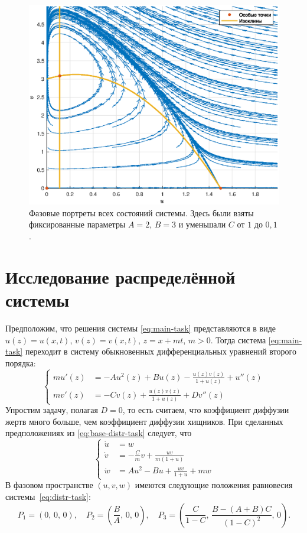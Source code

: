 \documentclass[a4paper, 11pt]{article}
\begin{document}
\begin{figure}[t]
		\includegraphics[width=0.45\linewidth]{schema/all_6.eps}
		\caption{Фазовые портреты всех состояний системы. Здесь были взяты фиксированные параметры $A = 2$, $B = 3$ и уменьшали $C$ от $1$ до $0,\!1$.}
	\end{figure}
	\clearpage


	\section{Исследование распределённой системы}
	Предположим, что решения системы \eqref{eq:main-task} представляются в виде $u(z) = u(x, t)$, $v(z) = v(x, t)$, $z = x + mt$, $m > 0$. Тогда система \eqref{eq:main-task} переходит в систему обыкновенных дифференциальных уравнений второго порядка:
	\begin{equation}\label{eq:base-distr-task}
		\left\{\begin{aligned}
		m u'(z) &= -Au^2(z) + Bu(z) - \frac{u(z)v(z)}{1 + u(z)} + u''(z)\\
		m v'(z) &= -Cv(z) + \frac{u(z)v(z)}{1 + u(z)} + Dv''(z)
		\end{aligned}\right.
	\end{equation}
	Упростим задачу, полагая $D = 0$, то есть считаем, что коэффициент диффузии жертв много больше, чем коэффициент диффузии хищников. При сделанных предположениях из \eqref{eq:base-distr-task} следует, что
	\begin{equation}\label{eq:distr-task}
		\left\{\begin{aligned}
		\dot u &= w \\
		\dot v &= -\frac{C}{m}v + \frac{uv}{m(1 + u)} \\
		\dot w &= Au^2 - Bu + \frac{uv}{1 + u} + mw
		\end{aligned}\right.
	\end{equation}
	В фазовом пространстве $(u, v, w)$ имеются следующие положения равновесия системы~\eqref{eq:distr-task}:
	$$
		P_1 = (0,\,0,\,0),\quad
		P_2 = \left(\frac{B}{A},\, 0,\,0\right),\quad
		P_3 = \left(\frac{C}{1-C},\,\frac{B - (A+B)C}{(1-C)^2},\,0\right).
	$$
\end{document}
